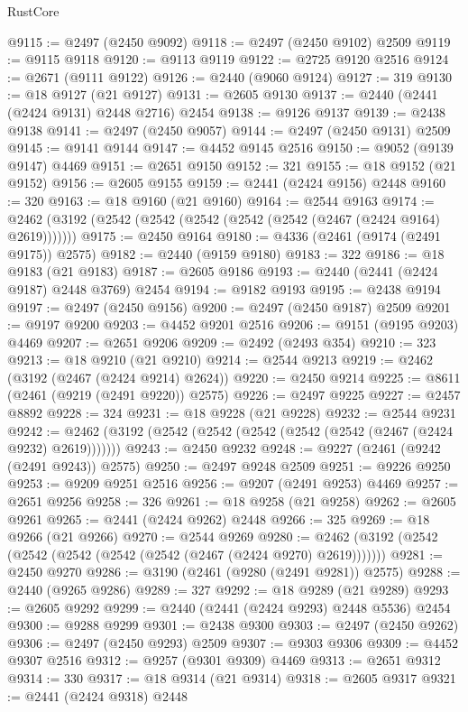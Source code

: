 \begin{lexlean}{RustCore}
\begin{coremodule}
@9115 := @2497 (@2450 @9092)
@9118 := @2497 (@2450 @9102) @2509
@9119 := @9115 @9118
@9120 := @9113 @9119
@9122 := @2725 @9120 @2516
@9124 := @2671 (@9111 @9122)
@9126 := @2440 (@9060 @9124)
@9127 := 319
@9130 := @18 @9127 (@21 @9127)
@9131 := @2605 @9130
@9137 := @2440 (@2441 (@2424 @9131) @2448 @2716) @2454
@9138 := @9126 @9137
@9139 := @2438 @9138
@9141 := @2497 (@2450 @9057)
@9144 := @2497 (@2450 @9131) @2509
@9145 := @9141 @9144
@9147 := @4452 @9145 @2516
@9150 := @9052 (@9139 @9147) @4469
@9151 := @2651 @9150
@9152 := 321
@9155 := @18 @9152 (@21 @9152)
@9156 := @2605 @9155
@9159 := @2441 (@2424 @9156) @2448
@9160 := 320
@9163 := @18 @9160 (@21 @9160)
@9164 := @2544 @9163
@9174 := @2462 (@3192 (@2542 (@2542 (@2542 (@2542 (@2542 (@2467 (@2424 @9164) @2619)))))))
@9175 := @2450 @9164
@9180 := @4336 (@2461 (@9174 (@2491 @9175)) @2575)
@9182 := @2440 (@9159 @9180)
@9183 := 322
@9186 := @18 @9183 (@21 @9183)
@9187 := @2605 @9186
@9193 := @2440 (@2441 (@2424 @9187) @2448 @3769) @2454
@9194 := @9182 @9193
@9195 := @2438 @9194
@9197 := @2497 (@2450 @9156)
@9200 := @2497 (@2450 @9187) @2509
@9201 := @9197 @9200
@9203 := @4452 @9201 @2516
@9206 := @9151 (@9195 @9203) @4469
@9207 := @2651 @9206
@9209 := @2492 (@2493 @354)
@9210 := 323
@9213 := @18 @9210 (@21 @9210)
@9214 := @2544 @9213
@9219 := @2462 (@3192 (@2467 (@2424 @9214) @2624))
@9220 := @2450 @9214
@9225 := @8611 (@2461 (@9219 (@2491 @9220)) @2575)
@9226 := @2497 @9225
@9227 := @2457 @8892
@9228 := 324
@9231 := @18 @9228 (@21 @9228)
@9232 := @2544 @9231
@9242 := @2462 (@3192 (@2542 (@2542 (@2542 (@2542 (@2542 (@2467 (@2424 @9232) @2619)))))))
@9243 := @2450 @9232
@9248 := @9227 (@2461 (@9242 (@2491 @9243)) @2575)
@9250 := @2497 @9248 @2509
@9251 := @9226 @9250
@9253 := @9209 @9251 @2516
@9256 := @9207 (@2491 @9253) @4469
@9257 := @2651 @9256
@9258 := 326
@9261 := @18 @9258 (@21 @9258)
@9262 := @2605 @9261
@9265 := @2441 (@2424 @9262) @2448
@9266 := 325
@9269 := @18 @9266 (@21 @9266)
@9270 := @2544 @9269
@9280 := @2462 (@3192 (@2542 (@2542 (@2542 (@2542 (@2542 (@2467 (@2424 @9270) @2619)))))))
@9281 := @2450 @9270
@9286 := @3190 (@2461 (@9280 (@2491 @9281)) @2575)
@9288 := @2440 (@9265 @9286)
@9289 := 327
@9292 := @18 @9289 (@21 @9289)
@9293 := @2605 @9292
@9299 := @2440 (@2441 (@2424 @9293) @2448 @5536) @2454
@9300 := @9288 @9299
@9301 := @2438 @9300
@9303 := @2497 (@2450 @9262)
@9306 := @2497 (@2450 @9293) @2509
@9307 := @9303 @9306
@9309 := @4452 @9307 @2516
@9312 := @9257 (@9301 @9309) @4469
@9313 := @2651 @9312
@9314 := 330
@9317 := @18 @9314 (@21 @9314)
@9318 := @2605 @9317
@9321 := @2441 (@2424 @9318) @2448

\end{coremodule}
\end{lexlean}
